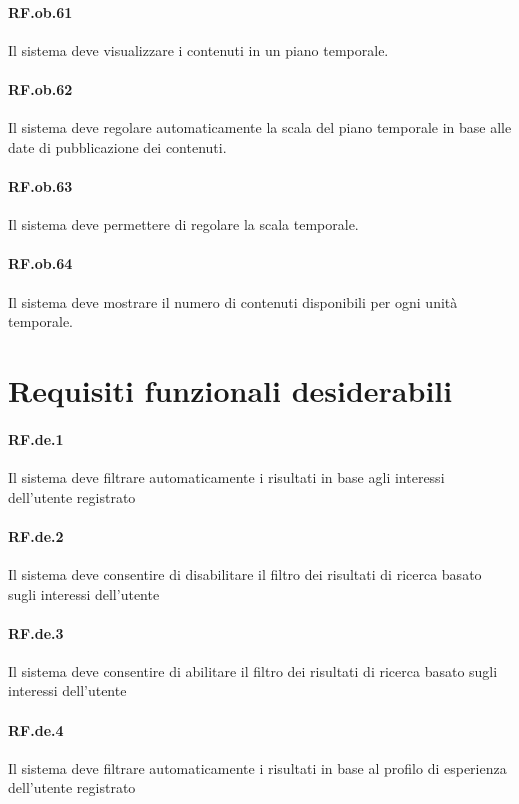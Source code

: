 \documentclass[10pt,a4paper,headinclude,footinclude,hidelinks]{scrreprt} %
\begin{document}
	\paragraph{RF.ob.61} Il sistema deve visualizzare i contenuti in un piano temporale.

	\paragraph{RF.ob.62} Il sistema deve regolare automaticamente la scala del piano temporale in base alle date di pubblicazione dei contenuti.

	\paragraph{RF.ob.63} Il sistema deve permettere di regolare la scala temporale.

	\paragraph{RF.ob.64} Il sistema deve mostrare il numero di contenuti disponibili per ogni unità temporale.

	\section{Requisiti funzionali desiderabili}
	\label{ch:stage:ar:requisiti:op}

	\paragraph{RF.de.1} Il sistema deve filtrare automaticamente i risultati in base agli interessi dell'utente registrato

	\paragraph{RF.de.2} Il sistema deve consentire di disabilitare il filtro dei risultati di ricerca basato sugli interessi dell'utente

	\paragraph{RF.de.3} Il sistema deve consentire di abilitare il filtro dei risultati di ricerca basato sugli interessi dell'utente

	\paragraph{RF.de.4} Il sistema deve filtrare automaticamente i risultati in base al profilo di esperienza dell'utente registrato
\end{document}
